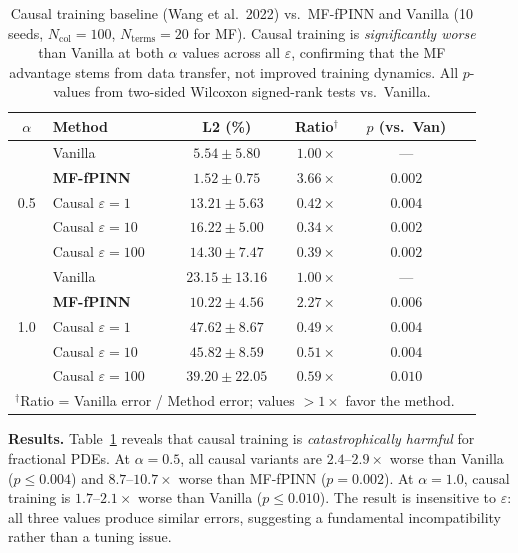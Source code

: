 \documentclass[preprint,12pt]{elsarticle}
\newcommand{\Ncol}{N_{\mathrm{col}}}
\begin{document}
\begin{table}[t]
\centering
\caption{Causal training baseline (Wang et al.\ 2022) vs.\ MF-fPINN and Vanilla (10 seeds, $\Ncol = 100$, $N_{\mathrm{terms}} = 20$ for MF). Causal training is \emph{significantly worse} than Vanilla at both $\alpha$ values across all $\varepsilon$, confirming that the MF advantage stems from data transfer, not improved training dynamics. All $p$-values from two-sided Wilcoxon signed-rank tests vs.\ Vanilla.}
\label{tab:causal}
\begin{tabular}{clcccc}
\toprule
$\alpha$ & Method & L2 (\%) & Ratio$^\dagger$ & $p$ (vs.\ Van) \\
\midrule
\multirow{5}{*}{0.5}
& Vanilla           & $5.54 \pm 5.80$  & $1.00\times$ & --- \\
& \textbf{MF-fPINN} & $\mathbf{1.52 \pm 0.75}$  & $\mathbf{3.66\times}$ & $0.002$ \\
& Causal $\varepsilon{=}1$   & $13.21 \pm 5.63$ & $0.42\times$ & $0.004$ \\
& Causal $\varepsilon{=}10$  & $16.22 \pm 5.00$ & $0.34\times$ & $0.002$ \\
& Causal $\varepsilon{=}100$ & $14.30 \pm 7.47$ & $0.39\times$ & $0.002$ \\
\midrule
\multirow{5}{*}{1.0}
& Vanilla           & $23.15 \pm 13.16$ & $1.00\times$ & --- \\
& \textbf{MF-fPINN} & $\mathbf{10.22 \pm 4.56}$  & $\mathbf{2.27\times}$ & $0.006$ \\
& Causal $\varepsilon{=}1$   & $47.62 \pm 8.67$  & $0.49\times$ & $0.004$ \\
& Causal $\varepsilon{=}10$  & $45.82 \pm 8.59$  & $0.51\times$ & $0.004$ \\
& Causal $\varepsilon{=}100$ & $39.20 \pm 22.05$ & $0.59\times$ & $0.010$ \\
\bottomrule
\multicolumn{5}{l}{\small $^\dagger$Ratio = Vanilla error / Method error; values $>1\times$ favor the method.} \\
\end{tabular}
\end{table}

\textbf{Results.} Table~\ref{tab:causal} reveals that causal training is \emph{catastrophically harmful} for fractional PDEs. At $\alpha = 0.5$, all causal variants are $2.4$--$2.9\times$ worse than Vanilla ($p \leq 0.004$) and $8.7$--$10.7\times$ worse than MF-fPINN ($p = 0.002$). At $\alpha = 1.0$, causal training is $1.7$--$2.1\times$ worse than Vanilla ($p \leq 0.010$). The result is insensitive to $\varepsilon$: all three values produce similar errors, suggesting a fundamental incompatibility rather than a tuning issue.
\end{document}
